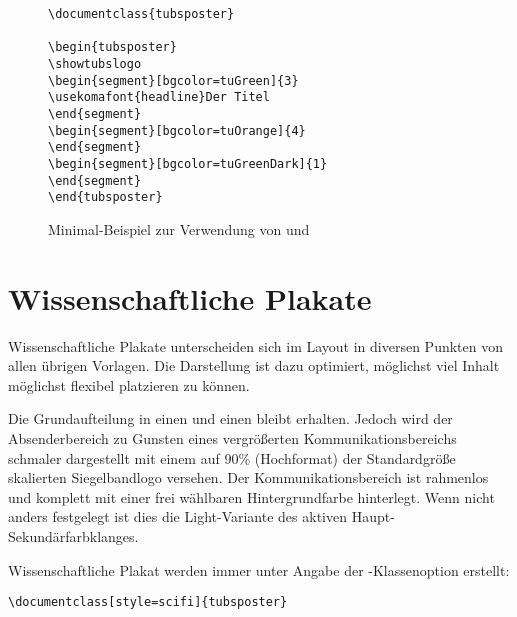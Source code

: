 \begin{figure}[!ht]
\begin{minipage}{0.65\textwidth}
\begin{lstlisting}
\documentclass{tubsposter}

\begin{tubsposter}
\showtubslogo
\begin{segment}[bgcolor=tuGreen]{3}
\usekomafont{headline}Der Titel
\end{segment}
\begin{segment}[bgcolor=tuOrange]{4}
\end{segment}
\begin{segment}[bgcolor=tuGreenDark]{1}
\end{segment}
\end{tubsposter}

\end{lstlisting}
\end{minipage}
\begin{minipage}{0.35\textwidth}
\end{minipage}
\caption{Minimal-Beispiel zur Verwendung von  und
  }
\end{figure}


\clearpage
\section{Wissenschaftliche Plakate}

Wissenschaftliche Plakate unterscheiden sich im Layout in diversen Punkten
von allen übrigen Vorlagen. Die Darstellung ist dazu optimiert, möglichst
viel Inhalt möglichst flexibel platzieren zu können.

Die Grundaufteilung in einen  und
einen 
bleibt erhalten.
Jedoch wird der Absenderbereich zu Gunsten eines vergrößerten Kommunikationsbereichs
schmaler dargestellt mit einem auf 90\% (Hochformat) der Standardgröße
skalierten Siegelbandlogo versehen.
Der Kommunikationsbereich ist rahmenlos und komplett mit einer frei
wählbaren Hintergrundfarbe hinterlegt.
Wenn nicht anders festgelegt ist dies die Light-Variante des aktiven
Haupt-Sekundärfarbklanges.%

\begin{sloppypar}
Wissenschaftliche Plakat werden immer unter Angabe der -Klassenoption
 erstellt:
\end{sloppypar}
\begin{lstlisting}
\documentclass[style=scifi]{tubsposter}
\end{lstlisting}

